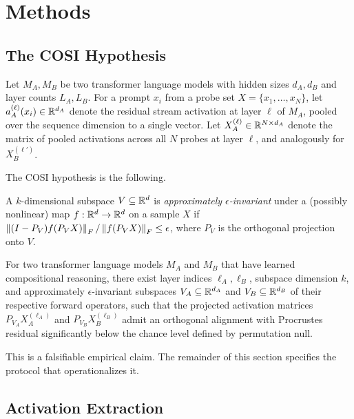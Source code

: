 \section{Methods}
\label{sec:methods}

\subsection{The COSI Hypothesis}

Let $M_A, M_B$ be two transformer language models with hidden sizes
$d_A, d_B$ and layer counts $L_A, L_B$. For a prompt $x_i$ from a probe set
$X = \{x_1, \ldots, x_N\}$, let $a_A^{(\ell)}(x_i) \in \mathbb{R}^{d_A}$ denote the
residual stream activation at layer $\ell$ of $M_A$, pooled over the
sequence dimension to a single vector. Let $X_A^{(\ell)} \in \mathbb{R}^{N \times d_A}$
denote the matrix of pooled activations across all $N$ probes at layer
$\ell$, and analogously for $X_B^{(\ell')}$.

The COSI hypothesis is the following.

\begin{definition}
A $k$-dimensional subspace $V \subseteq \mathbb{R}^d$ is \emph{approximately
$\epsilon$-invariant} under a (possibly nonlinear) map $f: \mathbb{R}^d \to \mathbb{R}^d$ on a
sample $X$ if
$\left\lVert(I - P_V) f(P_V X)\right\rVert_F / \left\lVert f(P_V X)\right\rVert_F \leq \epsilon$,
where $P_V$ is the orthogonal projection onto $V$.
\end{definition}

\begin{proposition}
\label{prop:cosi}
For two transformer language models $M_A$ and $M_B$ that have learned
compositional reasoning, there exist layer indices $\ell_A, \ell_B$,
subspace dimension $k$, and approximately $\epsilon$-invariant subspaces
$V_A \subseteq \mathbb{R}^{d_A}$ and $V_B \subseteq \mathbb{R}^{d_B}$ of their respective
forward operators, such that the projected activation matrices
$P_{V_A} X_A^{(\ell_A)}$ and $P_{V_B} X_B^{(\ell_B)}$ admit an orthogonal
alignment with Procrustes residual significantly below the chance level
defined by permutation null.
\end{proposition}

This is a falsifiable empirical claim. The remainder of this section
specifies the protocol that operationalizes it.

\subsection{Activation Extraction}

